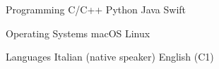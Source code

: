

\begin{cvskills}

  \cvskill
    {Programming} %
    {C/C++ {\enskip\cdotp\enskip} Python {\enskip\cdotp\enskip} Java {\enskip\cdotp\enskip} Swift} %
    
  \cvskill
    {Operating Systems} %
    {macOS {\enskip\cdotp\enskip} Linux} %

  \cvskill
    {Languages} %
    {Italian (native speaker) {\enskip\cdotp\enskip} English (C1)} %

\end{cvskills}
